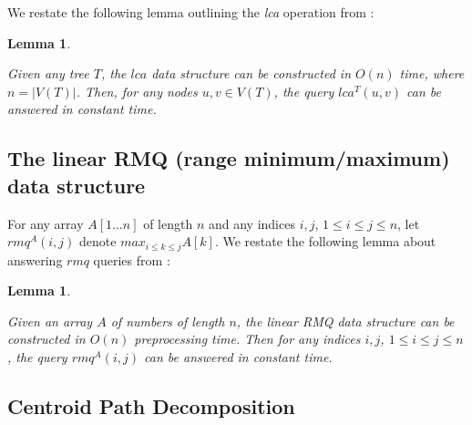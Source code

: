 \documentclass[12pt,a4paper]{article}
\newtheorem{lca}[incompatibility]{Lemma}
\newtheorem{linearrmq}[incompatibility]{Lemma}
\begin{document}
    We restate the following lemma outlining the \textit{lca} operation from \cite{bender2000lca}:
    \newline

    \begin{lca}
        \label{lem:lca}

        Given any tree $T$, the $lca$ data structure can be constructed in $O(n)$ time, where $n = |V(T)|$. Then, for any nodes $u, v \in V(T)$, the query $lca^{T}(u, v)$ can be answered in constant time.
    \end{lca}

    \subsection{The linear RMQ (range minimum/maximum) data structure}

    For any array $A[1 ... n]$ of length $n$ and any indices $i, j$, $1 \leq i \leq j \leq n$, let $rmq^A(i, j)$ denote $max_{i \leq k \leq j}A[k]$. We restate the following lemma about answering $rmq$ queries from \cite{bender2000lca}:
    \newline

    \begin{linearrmq}
        \label{lem:linearrmq}

        Given an array $A$ of numbers of length $n$, the \textit{linear RMQ data structure} can be constructed in $O(n)$ preprocessing time. Then for any indices $i, j$, $1 \leq i \leq j \leq n$, the query $rmq^A(i, j)$ can be answered in constant time.
    \end{linearrmq}

    \subsection{Centroid Path Decomposition}
\end{document}
